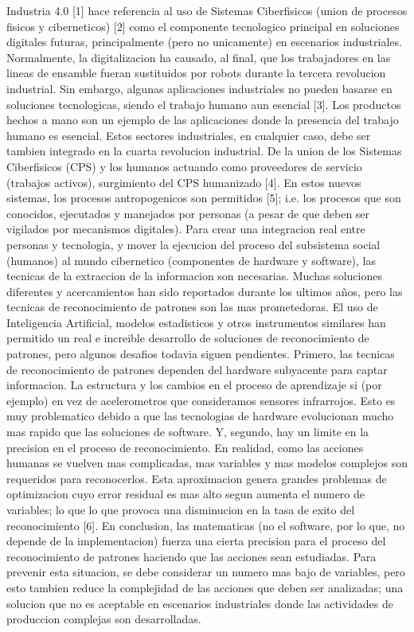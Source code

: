 \documentclass{paper}
\begin{document}
Industria 4.0 [1] hace referencia al uso de Sistemas Ciberfisicos (union de procesos fisicos y ciberneticos) [2] como el componente tecnologico principal en soluciones digitales futuras, principalmente (pero no unicamente) en escenarios industriales. Normalmente, la digitalizacion ha causado, al final, que los trabajadores en las lineas de ensamble fueran sustituidos por robots durante la tercera revolucion industrial.
Sin embargo, algunas aplicaciones industriales no pueden basarse en soluciones tecnologicas, siendo el trabajo humano aun esencial [3]. Los productos hechos a mano son un ejemplo de las aplicaciones donde la presencia del trabajo humano es esencial. Estos sectores industriales, en cualquier caso, debe ser tambien integrado en la cuarta revolucion industrial. De la union de los Sistemas Ciberfisicos (CPS) y los humanos actuando como proveedores de servicio (trabajos activos), surgimiento del CPS humanizado [4]. En estos nuevos sistemas, los procesos antropogenicos son permitidos [5]; i.e. los procesos que son conocidos, ejecutados y manejados por personas (a pesar de que deben ser vigilados por mecanismos digitales).
Para crear una integracion real entre personas y tecnologia, y mover la ejecucion del proceso del subsistema social (humanos) al mundo cibernetico (componentes de hardware y software), las tecnicas de la extraccion de la informacion son necesarias. Muchas soluciones diferentes y acercamientos han sido reportados durante los ultimos años, pero las tecnicas de reconocimiento de patrones son las mas prometedoras.
El uso de Inteligencia Artificial, modelos estadisticos y otros instrumentos similares han permitido un real e increible desarrollo de soluciones de reconocimiento de patrones, pero algunos desafios todavia siguen pendientes.
Primero, las tecnicas de reconocimiento de patrones dependen del hardware subyacente para captar informacion. La estructura y los cambios en el proceso de aprendizaje si (por ejemplo) en vez de acelerometros que  consideramos sensores infrarrojos. Esto es muy problematico debido a que las tecnologias de hardware evolucionan mucho mas rapido que las soluciones de software.
Y, segundo, hay un limite en la precision en el proceso de reconocimiento. En realidad, como las acciones humanas se vuelven mas complicadas, mas variables y mas modelos complejos son requeridos para reconocerlos. Esta aproximacion genera grandes problemas de optimizacion cuyo error residual es mas alto segun aumenta el numero de variables; lo que lo que provoca una disminucion en la tasa de exito del reconocimiento [6]. En conclusion, las matematicas (no el software, por lo que, no depende de la implementacion) fuerza una cierta precision para el proceso del reconocimiento de patrones haciendo que las acciones sean estudiadas. Para prevenir esta situacion, se debe considerar un numero mas bajo de variables, pero esto tambien reduce la complejidad de las acciones que deben ser analizadas; una solucion que no es aceptable en escenarios industriales donde las actividades de produccion complejas son desarrolladas.
\end{document}
